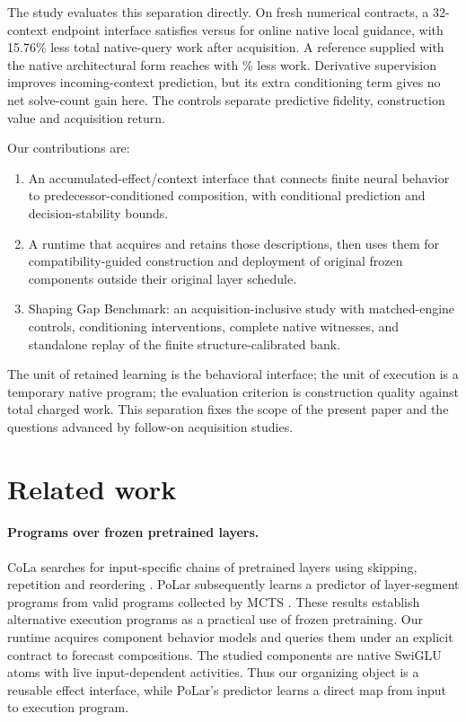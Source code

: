 \documentclass[11pt]{article}
\begin{document}
The study evaluates this separation directly. On \TestConditions{} fresh
numerical contracts, a 32-context endpoint interface satisfies
\ValueFewSolved{} versus \NativeSolved{} for online native local guidance,
with 15.76\% less total native-query work after acquisition. A reference supplied
with the native architectural form reaches \StructuredSolved{} with
\StructuredSaving{}\% less work. Derivative supervision improves incoming-context
prediction, but its extra conditioning term gives no net solve-count gain here.
The controls separate predictive fidelity, construction value and acquisition
return.

\begin{samepage}
Our contributions are:
\begin{enumerate}[leftmargin=*,itemsep=0.2em]
 \item An accumulated-effect/context interface that connects finite neural
       behavior to predecessor-conditioned composition, with conditional
       prediction and decision-stability bounds.
 \item A runtime that acquires and retains those descriptions, then uses them
       for compatibility-guided construction and deployment of original frozen
       components outside their original layer schedule.
 \item Shaping Gap Benchmark: an acquisition-inclusive study with matched-engine controls,
       conditioning interventions, complete native witnesses, and standalone
       replay of the finite structure-calibrated bank.
\end{enumerate}
\end{samepage}

The unit of retained learning is the behavioral interface; the unit of execution
is a temporary native program; the evaluation criterion is construction quality
against total charged work. This separation fixes the scope of the present
paper and the questions advanced by follow-on acquisition studies.

\section{Related work}
\paragraph{Programs over frozen pretrained layers.}
CoLa searches for input-specific chains of pretrained layers using skipping,
repetition and reordering \citep{cola}. PoLar subsequently learns a predictor
of layer-segment programs from valid programs collected by MCTS
\citep{polar}. These results establish alternative execution programs as a
practical use of frozen pretraining. Our runtime acquires component behavior
models and queries them under an explicit contract to forecast compositions.
The studied components are native SwiGLU atoms with live input-dependent
activities. Thus our organizing object is a reusable effect interface, while
PoLar's predictor learns a direct map from input to execution program.
\end{document}
